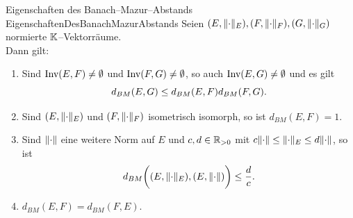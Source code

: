 \begin{lemma}{Eigenschaften des Banach--Mazur--Abstands}
             {EigenschaftenDesBanachMazurAbstands}
Seien $(E, \lVert\cdot\rVert_E), (F, \lVert\cdot\rVert_F), (G, \lVert\cdot\rVert_G)$
normierte $\mathbb{K}$--Vektorräume.\\
Dann gilt:
\begin{enumerate}[(1)]
	\item \label{EigenschaftenDesBanachMazurAbstands1}
	Sind $\mathop{\textrm{Inv}}\nolimits(E, F) \neq \emptyset$ und $\mathop{\textrm{Inv}}\nolimits(F, G) \neq \emptyset$,
	so auch $\mathop{\textrm{Inv}}\nolimits(E, G) \neq \emptyset$ und es gilt
	\[d_{BM}(E,G)\le d_{BM}(E,F)d_{BM}(F,G)\text.\]
	\item \label{EigenschaftenDesBanachMazurAbstands2}
	Sind $(E, \lVert\cdot\rVert_E)$ und $(F, \lVert\cdot\rVert_F)$ isometrisch isomorph, so ist
	$d_{BM}(E,F) = 1$.
	\item \label{EigenschaftenDesBanachMazurAbstands3}
	Sind $\lVert\cdot\rVert$ eine weitere Norm auf $E$ und $c, d \in \mathbb{R}_{>0}$
	mit $c \lVert\cdot\rVert \le \lVert\cdot\rVert_E \le d \lVert\cdot\rVert$, so ist
	\[d_{BM}\bigg((E, \lVert\cdot\rVert_E), (E, \lVert\cdot\rVert) \bigg) \le \frac d c
	\text.\]
	\item\label{EigenschaftenDesBanachMazurAbstands4}
	$d_{BM}(E,F)= d_{BM}(F,E)$.
\end{enumerate}
\end{lemma}
